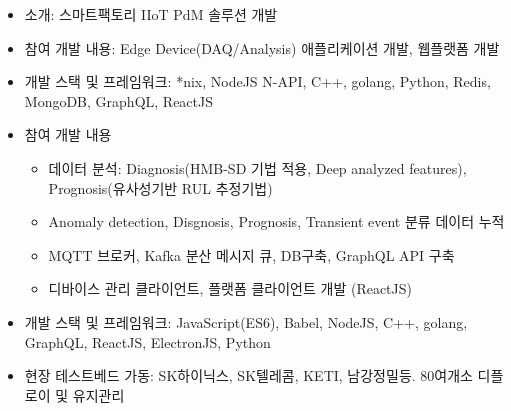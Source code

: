 
\begin{itemize}[label=]
	\item 소개: 스마트팩토리 IIoT PdM 솔루션 개발
	\item 참여 개발 내용: Edge Device(DAQ/Analysis) 애플리케이션 개발, 웹플랫폼 개발
	\item 개발 스택 및 프레임워크: *nix, NodeJS N-API, C++, golang, Python, Redis, MongoDB, GraphQL, ReactJS
	\item 참여 개발 내용
	      \begin{itemize}[label=]
		      \item 데이터 분석: Diagnosis(HMB-SD 기법 적용, Deep analyzed features), Prognosis(유사성기반 RUL 추정기법)
		      \item Anomaly detection, Disgnosis, Prognosis, Transient event 분류 데이터 누적
		      \item MQTT 브로커, Kafka 분산 메시지 큐, DB구축, GraphQL API 구축
		      \item 디바이스 관리 클라이언트, 플랫폼 클라이언트 개발 (ReactJS)
	      \end{itemize}
	\item 개발 스택 및 프레임워크: JavaScript(ES6), Babel, NodeJS, C++, golang, GraphQL, ReactJS, ElectronJS, Python
	\item 현장 테스트베드 가동: SK하이닉스, SK텔레콤, KETI, 남강정밀등. 80여개소 디플로이 및 유지관리
\end{itemize}
